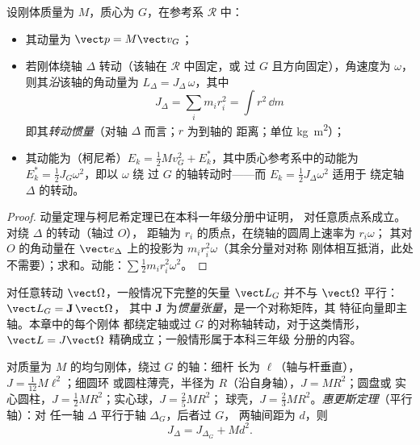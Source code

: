 \begin{proposition}[动量、角动量、动能]\label{prop:b2:rigid-body-mechanics:kinetic}
设刚体质量为 $M$，质心为 $G$，在参考系 $\mathcal R$ 中：
\begin{itemize}
  \item 其动量为 $\vect p = M\vect v_G$；
  \item 若刚体绕轴 $\Delta$ 转动（该轴在 $\mathcal R$ 中固定，或
        过 $G$ 且方向固定），角速度为
        $\omega$，则其\emph{沿}该轴的角动量为
        $L_\Delta = J_\Delta\,\omega$，其中
        \[
        J_\Delta = \sum_i m_i r_i^2 = \int r^2\,\dd m
        \]
        即其\emph{转动惯量}（对轴 $\Delta$ 而言；$r$ 为到轴的
        距离；单位 \unit{kg.m^2}）；
  \item 其动能为（柯尼希）$E_k = \tfrac12Mv_G^2 +
        E_k^*$，其中质心参考系中的动能为
        $E_k^* = \tfrac12J_{G}\omega^2$，即以 $\omega$ 绕
        过 $G$ 的轴转动时——而 $E_k = \tfrac12J_\Delta\omega^2$ 适用于
        绕定轴 $\Delta$ 的转动。
\end{itemize}
\end{proposition}

\begin{proof}
动量定理与柯尼希定理已在本科一年级分册中证明，
对任意质点系成立。对绕 $\Delta$ 的转动（轴过 $O$），
距轴为 $r_i$ 的质点，在绕轴的圆周上速率为 $r_i\omega$；
其对 $O$ 的角动量在 $\vect e_\Delta$ 上的投影为
$m_ir_i^2\omega$（其余分量对对称
刚体相互抵消，此处不需要）；求和。动能：$\sum\tfrac12m_ir_i^2
\omega^2$。
\end{proof}

\begin{remark}[在本阶段不加证明地承认]\label{rem:b2:rigid-body-mechanics:tensor}
对任意转动 $\vect\Omega$，一般情况下完整的矢量 $\vect L_G$
并不与 $\vect\Omega$ 平行：$\vect L_G = \mathbf J\,\vect\Omega$，
其中 $\mathbf J$ 为\emph{惯量张量}，是一个对称矩阵，其
特征向量即主轴。本章中的每个刚体
都绕定轴或过 $G$ 的对称轴转动，对于这类情形，
$\vect L = J\vect\Omega$ 精确成立；一般情形属于本科三年级
分册的内容。
\end{remark}

\begin{proposition}[转动惯量]\label{prop:b2:rigid-body-mechanics:inertia}
对质量为 $M$ 的均匀刚体，绕过 $G$ 的轴：细杆
长为 $\ell$（轴与杆垂直），$J = \tfrac1{12}M\ell^2$；细圆环
或圆柱薄壳，半径为 $R$（沿自身轴），$J = MR^2$；圆盘或
实心圆柱，$J = \tfrac12MR^2$；实心球，$J = \tfrac25MR^2$；
球壳，$J = \tfrac23MR^2$。\emph{惠更斯定理}（平行轴）：对
任一轴 $\Delta$ 平行于轴 $\Delta_G$，后者过 $G$，
两轴间距为 $d$，则
\[
J_\Delta = J_{\Delta_G} + Md^2 .
\]
\end{proposition}

